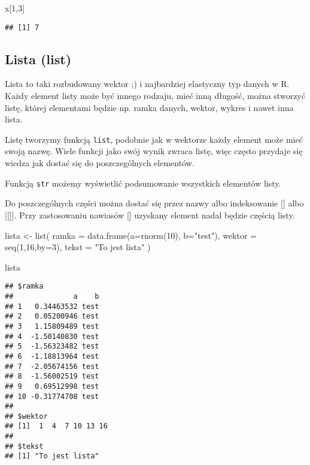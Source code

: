 \documentclass[
]{book}
\newenvironment{Shaded}{\begin{snugshade}}{\end{snugshade}}
\newcommand{\AttributeTok}[1]{\textcolor[rgb]{0.77,0.63,0.00}{#1}}
\newcommand{\DecValTok}[1]{\textcolor[rgb]{0.00,0.00,0.81}{#1}}
\newcommand{\FunctionTok}[1]{\textcolor[rgb]{0.00,0.00,0.00}{#1}}
\newcommand{\NormalTok}[1]{#1}
\newcommand{\OtherTok}[1]{\textcolor[rgb]{0.56,0.35,0.01}{#1}}
\newcommand{\StringTok}[1]{\textcolor[rgb]{0.31,0.60,0.02}{#1}}
\begin{document}
\begin{Shaded}
\begin{Highlighting}[]
\NormalTok{x[}\DecValTok{1}\NormalTok{,}\DecValTok{3}\NormalTok{]}
\end{Highlighting}
\end{Shaded}

\begin{verbatim}
## [1] 7
\end{verbatim}

\hypertarget{lista-list}{%
\subsection{Lista (list)}\label{lista-list}}

Lista to taki rozbudowany wektor ;) i najbardziej elastyczny typ danych w R. Każdy element listy może być innego rodzaju, mieć inną długość, można stworzyć listę, której elementami będzie np. ramka danych, wektor, wykres i nawet inna lista.

Listę tworzymy funkcją \texttt{list}, podobnie jak w wektorze każdy element może mieć swoją nazwę. Wiele funkcji jako swój wynik zwraca listę, więc często przydaje się wiedza jak dostać się do poszczególnych elementów.

Funkcją \texttt{str} możemy wyświetlić podsumowanie wszystkich elementów listy.

Do poszczególnych części można dostać się przez nazwy albo indeksowanie {[}{]} albo {[}{[}{]}{]}. Przy zastosowaniu nawiasów {[}{]} uzyskany element nadal będzie częścią listy.

\begin{Shaded}
\begin{Highlighting}[]
\NormalTok{lista }\OtherTok{\textless{}{-}} \FunctionTok{list}\NormalTok{( }\AttributeTok{ramka =} \FunctionTok{data.frame}\NormalTok{(}\AttributeTok{a=}\FunctionTok{rnorm}\NormalTok{(}\DecValTok{10}\NormalTok{), }\AttributeTok{b=}\StringTok{"test"}\NormalTok{), }
               \AttributeTok{wektor =} \FunctionTok{seq}\NormalTok{(}\DecValTok{1}\NormalTok{,}\DecValTok{16}\NormalTok{,}\AttributeTok{by=}\DecValTok{3}\NormalTok{), }
               \AttributeTok{tekst =} \StringTok{"To jest lista"}\NormalTok{ )}

\NormalTok{lista}
\end{Highlighting}
\end{Shaded}

\begin{verbatim}
## $ramka
##              a    b
## 1   0.34463532 test
## 2   0.05200946 test
## 3   1.15809489 test
## 4  -1.50140830 test
## 5  -1.56323482 test
## 6  -1.18813964 test
## 7  -2.05674156 test
## 8  -1.56002519 test
## 9   0.69512998 test
## 10 -0.31774708 test
## 
## $wektor
## [1]  1  4  7 10 13 16
## 
## $tekst
## [1] "To jest lista"
\end{verbatim}
\end{document}
